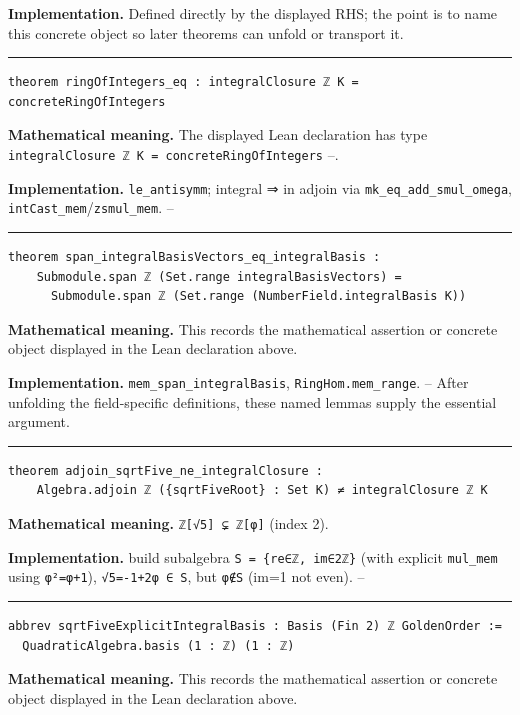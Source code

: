 \documentclass[UTF8,a4paper,11pt,fontset=fandol]{ctexart}
\theoremstyle{definition}
\newcommand{\statementsep}{\par\medskip\hrule\medskip}
\begin{document}
\noindent\textbf{Implementation.} Defined directly by the displayed RHS; the point is to name this concrete object so later theorems can unfold or transport it.\par
\statementsep
\begin{verbatim}
theorem ringOfIntegers_eq : integralClosure ℤ K = concreteRingOfIntegers
\end{verbatim}
\noindent\textbf{Mathematical meaning.} The displayed Lean declaration has type \texttt{integralClosure ℤ K = concreteRingOfIntegers} --.\par
\noindent\textbf{Implementation.} \texttt{le\_\allowbreak{}antisymm}; integral ⇒ in adjoin via \texttt{mk\_\allowbreak{}eq\_\allowbreak{}add\_\allowbreak{}smul\_\allowbreak{}omega}, \texttt{intCast\_\allowbreak{}mem}/\texttt{zsmul\_\allowbreak{}mem}. --\par
\statementsep
\begin{verbatim}
theorem span_integralBasisVectors_eq_integralBasis :
    Submodule.span ℤ (Set.range integralBasisVectors) =
      Submodule.span ℤ (Set.range (NumberField.integralBasis K))
\end{verbatim}
\noindent\textbf{Mathematical meaning.} This records the mathematical assertion or concrete object displayed in the Lean declaration above.\par
\noindent\textbf{Implementation.} \texttt{mem\_\allowbreak{}span\_\allowbreak{}integralBasis}, \texttt{RingHom.\allowbreak{}mem\_\allowbreak{}range}. -- After unfolding the field-specific definitions, these named lemmas supply the essential argument.\par
\statementsep
\begin{verbatim}
theorem adjoin_sqrtFive_ne_integralClosure :
    Algebra.adjoin ℤ ({sqrtFiveRoot} : Set K) ≠ integralClosure ℤ K
\end{verbatim}
\noindent\textbf{Mathematical meaning.} \texttt{ℤ[√5] ⊊ ℤ[φ]} (index 2).\par
\noindent\textbf{Implementation.} build subalgebra \texttt{S = \{re∈ℤ, im∈2ℤ\}} (with explicit \texttt{mul\_\allowbreak{}mem} using \texttt{φ²=φ+1}), \texttt{√5=-1+2φ ∈ S}, but \texttt{φ∉S} (im=1 not even). --\par
\statementsep
\begin{verbatim}
abbrev sqrtFiveExplicitIntegralBasis : Basis (Fin 2) ℤ GoldenOrder :=
  QuadraticAlgebra.basis (1 : ℤ) (1 : ℤ)
\end{verbatim}
\noindent\textbf{Mathematical meaning.} This records the mathematical assertion or concrete object displayed in the Lean declaration above.\par
\end{document}
